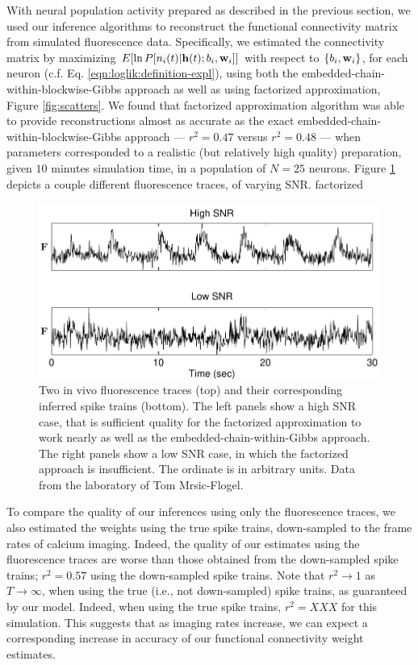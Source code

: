 With neural population activity prepared as described in the previous section, we used our inference algorithms to reconstruct the functional connectivity matrix from simulated fluorescence data. Specifically, we estimated the connectivity matrix by maximizing $E[\ln P[n_i(t)| \mathbf{h}(t); b_i, \mathbf{w}_i]]$ with respect to $\{b_i,\mathbf{w}_i\}$, for each neuron (c.f. Eq. \ref{eqn:loglik:definition-expl}), using both the embedded-chain-within-blockwise-Gibbs approach as well as using factorized approximation, Figure \ref{fig:scatters}.  We found that factorized approximation algorithm was able to provide reconstructions almost as accurate as the exact embedded-chain-within-blockwise-Gibbs approach --- $r^2=0.47$ versus $r^2=0.48$ --- when parameters corresponded to a realistic (but relatively high quality) preparation, given $10$ minutes simulation time, in a population of $N=25$ neurons. Figure \ref{fig:example_traces} depicts a couple different fluorescence traces, of varying SNR. 
factorized
\begin{figure}[h]
\centering
\includegraphics[width=\hsize]{../figs/example_traces}
\caption{Two in vivo fluorescence traces (top) and their corresponding inferred spike trains (bottom).  The left panels show a high SNR case, that is sufficient quality for the factorized approximation to work nearly as well as the embedded-chain-within-Gibbs approach.  The right panels show a low SNR case, in which the factorized approach is insufficient. The ordinate is in arbitrary units.  Data from the laboratory of Tom Mrsic-Flogel.}
\label{fig:example_traces}
\end{figure}

To compare the quality of our inferences using only the fluorescence traces, we also estimated the weights using the true spike trains, down-sampled to the frame rates of calcium imaging.  Indeed, the quality of our estimates using the fluorescence traces are worse than those obtained from the down-sampled spike trains; $r^2=0.57$ using the down-sampled spike trains.  Note that $r^2\rightarrow 1$ as $T \rightarrow \infty$, when using the true (i.e., not down-sampled) spike trains, as guaranteed by our model.  Indeed, when using the true spike trains, $r^2=XXX$ for this simulation.  This suggests that as imaging rates increase, we can expect a corresponding increase in accuracy of our functional connectivity weight estimates.

